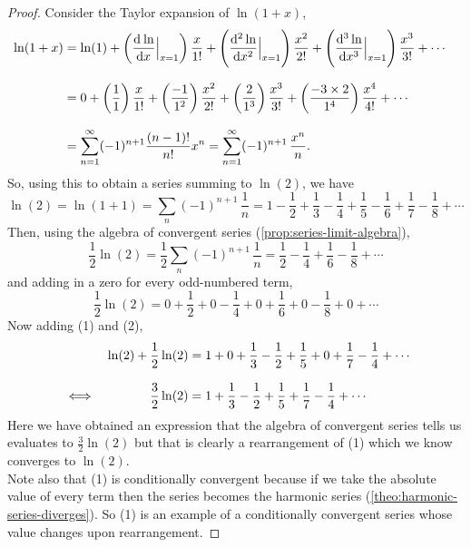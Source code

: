 \documentclass[../MathsNotesBase.tex]{subfiles}
\begin{document}
{		\bigskip
		\begin{proof}
			Consider the Taylor expansion of ${ \ln(1+x) }$,
			\[\begin{aligned}
				\ln(1+x) &= \ln(1) + \left(\dod{\ln}{x}\Bigr\rvert_{x=1}\right) \frac{x}{1!} + \left(\dod[2]{\ln}{x}\Bigr\rvert_{x=1}\right) \frac{x^2}{2!} + \left(\dod[3]{\ln}{x}\Bigr\rvert_{x=1}\right) \frac{x^3}{3!} + \cdots \nnn
				&= 0 + \left(\frac{1}{1}\right) \frac{x}{1!} + \left(\frac{-1}{1^2}\right) \frac{x^2}{2!} + \left(\frac{2}{1^3}\right) \frac{x^3}{3!} + \left(\frac{-3 \times 2}{1^4}\right) \frac{x^4}{4!} + \cdots &\sidecomment{} \nnn
				&= \sum_{n=1}^\infty (-1)^{n+1} \frac{(n-1)!}{n!} x^n = \sum_{n=1}^\infty (-1)^{n+1}\, \frac{x^n}{n}.
			\end{aligned}\]
			So, using this to obtain a series summing to $\ln(2)$, we have
			\[ \ln(2) = \ln(1 + 1) = \sum_n (-1)^{n+1}\, \frac{1}{n} = 1 - \frac{1}{2} + \frac{1}{3} - \frac{1}{4} + \frac{1}{5} - \frac{1}{6} + \frac{1}{7} - \frac{1}{8} + \cdots  \tag{1} \]
			Then, using the algebra of convergent series (\autoref{prop:series-limit-algebra}),
			\[ \frac{1}{2} \ln(2) = \frac{1}{2} \sum_n (-1)^{n+1}\, \frac{1}{n} = \frac{1}{2} - \frac{1}{4} + \frac{1}{6} - \frac{1}{8} + \cdots \]
			and adding in a zero for every odd-numbered term,
			\[ \frac{1}{2} \ln(2) = 0 + \frac{1}{2} + 0 - \frac{1}{4} + 0 + \frac{1}{6} + 0 - \frac{1}{8} + 0 + \cdots  \tag{2} \]
			Now adding (1) and (2),
			\[\begin{aligned}
				&& \ln(2) + \frac{1}{2} \ln(2) &= 1 + 0 + \frac{1}{3} - \frac{1}{2} + \frac{1}{5} + 0 + \frac{1}{7} - \frac{1}{4} + \cdots  \nnn
				& \iff & \frac{3}{2} \ln(2) &= 1 + \frac{1}{3} - \frac{1}{2} + \frac{1}{5} + \frac{1}{7} - \frac{1}{4} + \cdots
			\end{aligned}\]
			Here we have obtained an expression that the algebra of convergent series tells us evaluates to ${ \frac{3}{2} \ln(2) }$ but that is clearly a rearrangement of (1) which we know converges to ${ \ln(2) }$.\\
			Note also that (1) is conditionally convergent because if we take the absolute value of every term then the series becomes the harmonic series (\autoref{theo:harmonic-series-diverges}). So (1) is an example of a conditionally convergent series whose value changes upon rearrangement.
		\end{proof}
		
}
\end{document}
